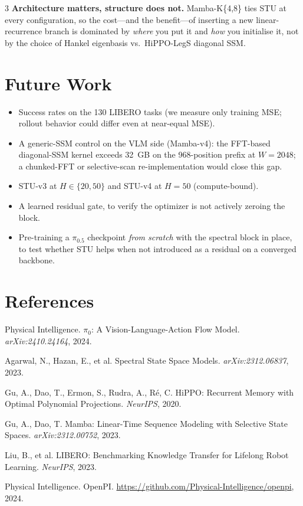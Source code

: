\documentclass[landscape]{article}
\renewcommand{\footnotesize}{\fontsize{17pt}{21pt}\selectfont}
\begin{document}
\begin{multicols}{3}
\textbf{Architecture matters, structure does not.} Mamba-K\{4,8\} ties STU at every configuration, so the cost---and the benefit---of inserting a new linear-recurrence branch is dominated by \emph{where} you put it and \emph{how} you initialise it, not by the choice of Hankel eigenbasis vs.\ HiPPO-LegS diagonal SSM.

\section*{Future Work}

\begin{itemize}[leftmargin=1.4em, nosep]
\item Success rates on the 130 LIBERO tasks (we measure only training MSE; rollout behavior could differ even at near-equal MSE).
\item A generic-SSM control on the VLM side (Mamba-v4): the FFT-based diagonal-SSM kernel exceeds 32~GB on the 968-position prefix at $W{=}2048$; a chunked-FFT or selective-scan re-implementation would close this gap.
\item STU-v3 at $H \in \{20, 50\}$ and STU-v4 at $H{=}50$ (compute-bound).
\item A learned residual gate, to verify the optimizer is not actively zeroing the block.
\item Pre-training a $\pi_{0.5}$ checkpoint \emph{from scratch} with the spectral block in place, to test whether STU helps when not introduced as a residual on a converged backbone.
\end{itemize}

\section*{References}
{\footnotesize
\begin{enumerate}[leftmargin=1.4em, nosep, label={[\arabic*]}]
\item Physical Intelligence. $\pi_0$: A Vision-Language-Action Flow Model. \textit{arXiv:2410.24164}, 2024.
\item Agarwal, N., Hazan, E., et al. Spectral State Space Models. \textit{arXiv:2312.06837}, 2023.
\item Gu, A., Dao, T., Ermon, S., Rudra, A., R\'e, C. HiPPO: Recurrent Memory with Optimal Polynomial Projections. \textit{NeurIPS}, 2020.
\item Gu, A., Dao, T. Mamba: Linear-Time Sequence Modeling with Selective State Spaces. \textit{arXiv:2312.00752}, 2023.
\item Liu, B., et al. LIBERO: Benchmarking Knowledge Transfer for Lifelong Robot Learning. \textit{NeurIPS}, 2023.
\item Physical Intelligence. OpenPI. \url{https://github.com/Physical-Intelligence/openpi}, 2024.
\end{enumerate}
}


\end{multicols}
\end{document}
